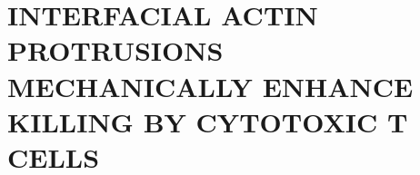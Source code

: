 \documentclass[phd,tocprelim]{cornell}
\begin{document}
%

%

\chapter{INTERFACIAL ACTIN PROTRUSIONS MECHANICALLY ENHANCE KILLING BY CYTOTOXIC T CELLS }
\label{chap:protrusions}

%
%
%
%
%
%
%
%


\end{document}
